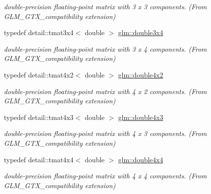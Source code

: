 \begin{DoxyCompactItemize}
\begin{DoxyCompactList}\small\item\em double-\/precision floating-\/point matrix with 3 x 3 components. (From G\+L\+M\+\_\+\+G\+T\+X\+\_\+compatibility extension) \end{DoxyCompactList}\item 
\hypertarget{group__gtx__compatibility_ga654560230666f15193a1e8b8bce27491}{}typedef detail\+::tmat3x4$<$ double $>$ \hyperlink{group__gtx__compatibility_ga654560230666f15193a1e8b8bce27491}{glm\+::double3x4}\label{group__gtx__compatibility_ga654560230666f15193a1e8b8bce27491}

\begin{DoxyCompactList}\small\item\em double-\/precision floating-\/point matrix with 3 x 4 components. (From G\+L\+M\+\_\+\+G\+T\+X\+\_\+compatibility extension) \end{DoxyCompactList}\item 
\hypertarget{group__gtx__compatibility_ga0cdcc9472e234c5f20efe618f340a7ad}{}typedef detail\+::tmat4x2$<$ double $>$ \hyperlink{group__gtx__compatibility_ga0cdcc9472e234c5f20efe618f340a7ad}{glm\+::double4x2}\label{group__gtx__compatibility_ga0cdcc9472e234c5f20efe618f340a7ad}

\begin{DoxyCompactList}\small\item\em double-\/precision floating-\/point matrix with 4 x 2 components. (From G\+L\+M\+\_\+\+G\+T\+X\+\_\+compatibility extension) \end{DoxyCompactList}\item 
\hypertarget{group__gtx__compatibility_gaf87e84456700888393c14e56f3d5716a}{}typedef detail\+::tmat4x3$<$ double $>$ \hyperlink{group__gtx__compatibility_gaf87e84456700888393c14e56f3d5716a}{glm\+::double4x3}\label{group__gtx__compatibility_gaf87e84456700888393c14e56f3d5716a}

\begin{DoxyCompactList}\small\item\em double-\/precision floating-\/point matrix with 4 x 3 components. (From G\+L\+M\+\_\+\+G\+T\+X\+\_\+compatibility extension) \end{DoxyCompactList}\item 
\hypertarget{group__gtx__compatibility_gac2163bb68964199937adcf6fc950d535}{}typedef detail\+::tmat4x4$<$ double $>$ \hyperlink{group__gtx__compatibility_gac2163bb68964199937adcf6fc950d535}{glm\+::double4x4}\label{group__gtx__compatibility_gac2163bb68964199937adcf6fc950d535}

\begin{DoxyCompactList}\small\item\em double-\/precision floating-\/point matrix with 4 x 4 components. (From G\+L\+M\+\_\+\+G\+T\+X\+\_\+compatibility extension) \end{DoxyCompactList}\end{DoxyCompactItemize}
